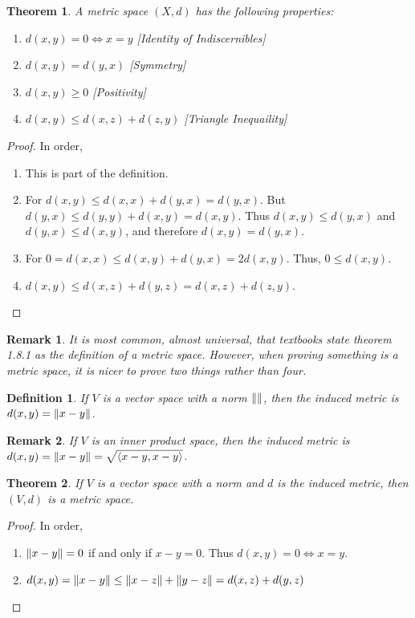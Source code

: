 \documentclass[12pt,oneside]{book}
\theoremstyle{mystyle}
\newtheorem{theorem}{Theorem}[section]
\newtheorem{definition}{Definition}[section]
\newtheorem{remark}{Remark}[section]
\begin{document}
\begin{theorem}
A metric space $(X,d)$ has the following properties:
\begin{enumerate}
\item $d(x,y) = 0 \Leftrightarrow x=y$ \hfill [Identity of Indiscernibles]
\item $d(x,y) = d(y,x)$ \hfill [Symmetry]
\item $d(x,y) \geq 0$ \hfill [Positivity]
\item $d(x,y) \leq d(x,z)+d(z,y)$ \hfill [Triangle Inequaility]
\end{enumerate}
\end{theorem}
\begin{proof}
In order,
\begin{enumerate}
\item This is part of the definition.
\item For $d(x,y) \leq d(x,x)+d(y,x) = d(y,x)$. But $d(y,x) \leq d(y,y)+d(x,y) = d(x,y)$. Thus $d(x,y)\leq d(y,x)$ and $d(y,x) \leq d(x,y)$, and therefore $d(x,y) = d(y,x)$.
\item For $0=d(x,x) \leq d(x,y)+d(y,x) = 2d(x,y)$. Thus, $0\leq d(x,y)$.
\item $d(x,y)\leq d(x,z)+d(y,z) = d(x,z)+d(z,y)$.
\end{enumerate}
\end{proof}

\begin{remark}
It is most common, almost universal, that textbooks state theorem 1.8.1 as the definition of a metric space. However, when proving something is a metric space, it is nicer to prove two things rather than four.
\end{remark}

\begin{definition}
If $V$ is a vector space with a norm $\norm{}$, then the induced metric is $d(x,y) = \norm{x-y}$.
\end{definition}

\begin{remark}
If $V$ is an inner product space, then the induced metric is $d(x,y) = \norm{x-y} = \sqrt{\langle x-y,x-y\rangle }$.
\end{remark}

\begin{theorem}
If $V$ is a vector space with a norm and $d$ is the induced metric, then $(V,d)$ is a metric space.
\end{theorem}
\begin{proof}
In order,
\begin{enumerate}
\item $\norm{x-y} = 0$ if and only if $x-y = 0$. Thus $d(x,y) = 0 \Leftrightarrow x=y$.
\item $d(x,y) = \norm{x-y}\leq \norm{x-z}+\norm{y-z} = d(x,z)+d(y,z)$
\end{enumerate}
\end{proof}
\end{document}
